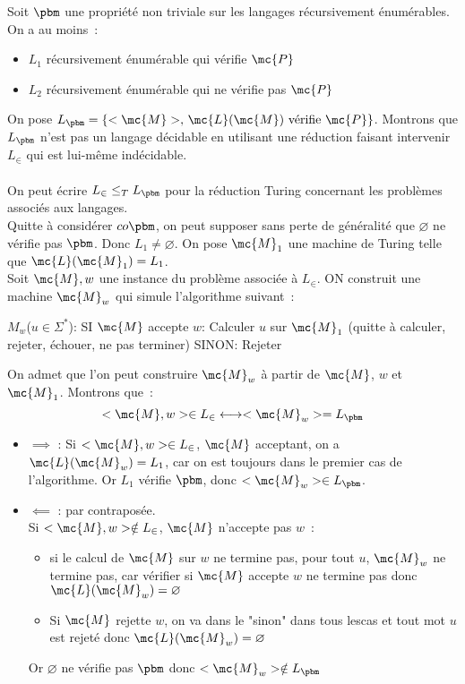 \begin{demonstration}
    Soit $\pbm$ une propriété non triviale sur les langages récursivement énumérables.\\
    On a au moins~:
    \begin{itemize}
        \item $L_1$ récursivement énumérable qui vérifie $\mc{P}$
        \item $L_2$ récursivement énumérable qui ne vérifie pas $\mc{P}$
    \end{itemize}
    On pose $L_\pbm = \{<\mc{M}>,\, \mc{L}(\mc{M}) \text{ vérifie } \mc{P}\}$. Montrons que $L_\pbm$ n'est pas un langage décidable en utilisant une réduction faisant intervenir $L_\in$ qui est lui-même indécidable.\\\\
    On peut écrire $L_\in \leq_T L_\pbm$ pour la réduction Turing concernant les problèmes associés aux langages.\\
    Quitte à considérer $co\pbm$, on peut supposer sans perte de généralité que $\varnothing$ ne vérifie pas $\pbm$. Donc $L_1 \neq \varnothing$. On pose $\mc{M}_1$ une machine de Turing telle que $\mc{L}(\mc{M}_1) = L_1$.\\
    Soit $\mc{M},w$ une instance du problème associée à $L_\in$. ON construit une machine $\mc{M}_w$ qui simule l'algorithme suivant~:
    \begin{lstLNAT}
    $M_w$($u \in \Sigma^*$):
        SI $\mc{M}$ accepte $w$:
            Calculer $u$ sur $\mc{M}_1$ (quitte à calculer, rejeter, échouer, ne pas terminer)
        SINON:
            Rejeter
    \end{lstLNAT}
    On admet que l'on peut construire $\mc{M}_w$ à partir de $\mc{M}$, $w$ et $\mc{M}_1$. Montrons que~:
    $$<\mc{M},w> \in L_\in \longleftrightarrow <\mc{M}_w> = L_\pbm$$
    \begin{itemize}
        \item $\boxed{\implies}$ : Si $<\mc{M},w> \in L_\in$, \ie $\mc{M}$ acceptant, on a $\mc{L}(\mc{M}_w) = L_1$, car on est toujours dans le premier cas de l'algorithme. Or $L_1$ vérifie $\pbm$, donc $<\mc{M}_w> \in L_\pbm$.
        \item $\boxed{\impliedby}$ : par contraposée.\\
        Si $<\mc{M},w> \notin L_\in$, \ie $\mc{M}$ n'accepte pas $w$~:
        \begin{itemize}
            \item si le calcul de $\mc{M}$ sur $w$ ne termine pas, pour tout $u$, $\mc{M}_w$ ne termine pas, car vérifier si $\mc{M}$ accepte $w$ ne termine pas donc $\mc{L}(\mc{M}_w) = \varnothing$
            \item Si $\mc{M}$ rejette $w$, on va dans le "sinon" dans tous lescas et tout mot $u$ est rejeté donc $\mc{L}(\mc{M}_w) = \varnothing$
        \end{itemize}
        Or $\varnothing$ ne vérifie pas $\pbm$ donc $<\mc{M}_w> \notin L_\pbm$
    \end{itemize}
\end{demonstration}

